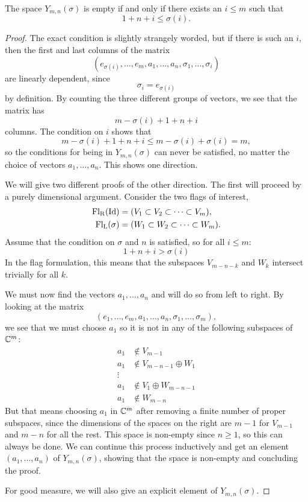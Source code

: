 \begin{lemma}
  The space $Y_{m,n}(\sigma)$ is empty if and only if there exists an
  $i \leq m$ such that
  \[ 1 + n + i \leq \sigma(i). \]
\end{lemma}
\begin{proof}
  The exact condition is slightly strangely worded, but if there is
  such an $i$, then the first and last columns of the matrix
  \[ (e_{\sigma(i)},\dots,e_m,a_1,\dots,a_n,\sigma_1,\dots,\sigma_i) \]
  are linearly dependent, since
  \[ \sigma_i = e_{\sigma(i)} \]
  by definition. By counting the three different groups of vectors, we
  see that the matrix has
  \[ m - \sigma(i) + 1 + n + i \]
  columns. The condition on $i$ shows that
  \[ m - \sigma(i) + 1 + n + i \leq m - \sigma(i) + \sigma(i) = m, \]
  so the conditions for being in $Y_{m,n}(\sigma)$ can never be
  satisfied, no matter the choice of vectors $a_1,\dots,a_n$. This
  shows one direction.

  We will give two different proofs of the other direction. The first
  will proceed by a purely dimensional argument. Consider the two
  flags of interest,
  \begin{align*}
    \mathrm{Fl_R}(\operatorname{Id}) &= (V_1 \subset V_2 \subset \dots \subset V_m),
    \\
    \mathrm{Fl_L}(\sigma) &= (W_1 \subset W_2 \subset \dots \subset
    W_m).
  \end{align*}
  Assume that the condition on $\sigma$ and $n$ is satisfied, so for
  all $i \leq m$:
  \[ 1 + n + i > \sigma(i) \]
  In the flag formulation, this means that the subspaces $V_{m-n-k}$
  and $W_k$ intersect trivially for all $k$.

  We must now find the vectors $a_1,\dots,a_n$ and will do so from
  left to right. By looking at the matrix
  \[ \left( e_1, \dots, e_m, a_1, \dots, a_n, \sigma_1, \dots,
    \sigma_m \right), \]
  we see that we must choose $a_1$ so it is not in any of the
  following subspaces of $\mathbb{C}^m$:
  \begin{align*}
    a_1 &\not\in V_{m-1} \\
    a_1 &\not\in V_{m-n-1} \oplus W_1 \\
    \vdots & \\
    a_1 &\not\in V_1\oplus W_{m-n-1} \\
    a_1 &\not\in W_{m-n}
  \end{align*}
  But that means choosing $a_1$ in $\mathbb{C}^m$ after removing a
  finite number of proper subspaces, since the dimensions of the
  spaces on the right are $m-1$ for $V_{m-1}$ and $m-n$ for
  all the rest. This space is non-empty since $n\geq 1$, so this can
  always be done. We can continue this process inductively and get an
  element $(a_1,\dots,a_n)$ of $Y_{m,n}(\sigma)$, showing that the
  space is non-empty and concluding the proof.

  For good measure, we will also give an explicit element of
  $Y_{m,n}(\sigma)$.
\end{proof}
